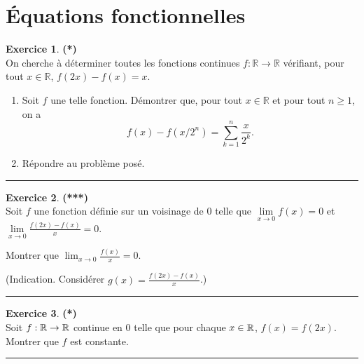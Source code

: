 \documentclass[a4paper,11pt]{article}
\theoremstyle{definition}
\newtheorem{exo}{Exercice} %
\begin{document}
\begin{minipage}[t]{1\linewidth}
	\section*{Équations fonctionnelles}
	\begin{minipage}[t]{0.48\linewidth}
		\raggedright
		
		
		
		\begin{exo}\textbf{(*)}\quad\\[0.2cm]
			On cherche à déterminer toutes les fonctions continues $f:\mathbb R\to\mathbb R$  vérifiant, pour tout $x\in\mathbb R$, $f(2x)-f(x)=x.$
			\begin{enumerate}
				\item Soit $f$ une telle fonction. Démontrer que, pour tout $x\in\mathbb R$ et pour tout $n\geq 1$, on a 
				$$f(x)-f(x/2^n)=\sum_{k=1}^n\frac{x}{2^k}.$$
				\item Répondre au problème posé.
			\end{enumerate}
			
			\centering
			\rule{1\linewidth}{0.6pt}
		\end{exo}
		
		
		

			\begin{exo}\textbf{(***)}\quad\\[0.2cm]
		Soit $f$ une fonction définie sur un voisinage de $0$ telle que $\lim\limits_{x\rightarrow 0}f(x)=0$ et $\lim\limits_{x\rightarrow 0}\frac{f(2x)-f(x)}{x}=0$.
		
		 Montrer que $\lim_{x\rightarrow 0}\frac{f(x)}{x}=0$.
		 
		  (Indication. Considérer $g(x)=\frac{f(2x)-f(x)}{x}$.)
		
		\centering
		\rule{1\linewidth}{0.6pt}
	\end{exo}
		
		
\medskip		
		
		
	\end{minipage}	
	\hfill\vrule\hfill
	\begin{minipage}[t]{0.48\linewidth}
		\raggedright
		
		
		\begin{exo}\textbf{(*)}\quad\\[0.2cm]
			Soit $f : \mathbb{R} \rightarrow \mathbb{R}$ continue en $0$ telle que pour chaque $x \in \mathbb{R}$,
			$f(x) = f(2x)$. Montrer que $f$ est constante.
			
			\centering
			\rule{1\linewidth}{0.6pt}
		\end{exo}
		

\end{minipage}
\end{minipage}
\end{document}

